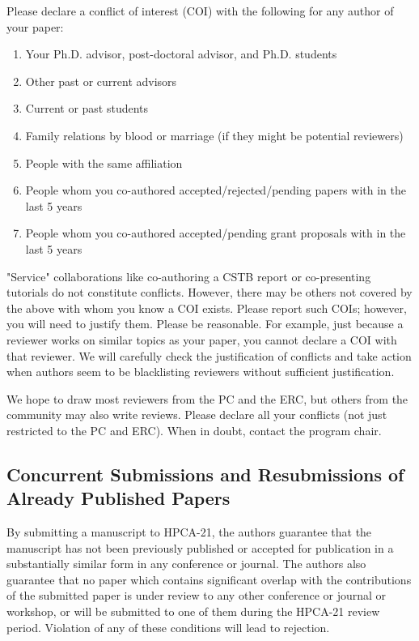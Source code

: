 \documentclass[pageno]{jpaper}
\begin{document}
Please declare a conflict of interest (COI) with the following for any author of your paper:

\begin{enumerate}
\item Your Ph.D. advisor, post-doctoral advisor, and Ph.D. students
\item Other past or current advisors
\item Current or past students
\item Family relations by blood or marriage (if they might be potential reviewers)
\item People with the same affiliation
\item People whom you co-authored accepted/rejected/pending papers with in the last 5 years
\item People whom you co-authored accepted/pending grant proposals with in the last 5 years
\end{enumerate}

"Service" collaborations like co-authoring a CSTB report or co-presenting tutorials do 
not constitute conflicts. However, there may be others not covered 
by the above with whom you know a COI exists. Please report such COIs; however, you 
will need to justify them. Please be reasonable. For example, just because a reviewer
works on similar topics as your paper, you cannot declare a COI with that reviewer. We
will carefully check the justification of conflicts and take action when authors seem to be 
blacklisting reviewers without sufficient justification. 

We hope to draw most reviewers 
from the PC and the ERC, but others from the community may also write reviews. Please
declare all your conflicts (not just restricted to the PC and ERC). When in doubt, 
contact the program chair.


\subsection{Concurrent Submissions and Resubmissions of Already Published Papers}

By submitting a manuscript to HPCA-21, the authors guarantee that the
manuscript has not been previously published or accepted for
publication in a substantially similar form in any conference or
journal. The authors also guarantee that no paper which contains
significant overlap with the contributions of the submitted paper is
under review to any other conference or journal or workshop, or will
be submitted to one of them during the HPCA-21 review
period. Violation of any of these conditions will lead to rejection.
\end{document}

